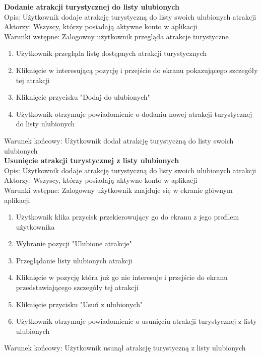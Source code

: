    \textbf{Dodanie atrakcji turystycznej do listy ulubionych} \\ 
        Opis: Użytkownik dodaje atrakcję turystyczną do listy swoich ulubionych atrakcji \\
        Aktorzy: Wszyscy, którzy posiadają aktywne konto w aplikacji \\
        Warunki wstępne: Zalogowny użytkownik przegląda atrakcje turystyczne \\
        \begin{enumerate}
            \item Użytkownik przegląda listę dostępnych atrakcji turystycznych
            \item Kliknięcie w interesującą pozycję i przejście do ekranu pokazującego szczegóły tej atrakcji
            \item Kliknięcie przycisku "Dodaj do ulubionych"
            \item Użytkownik otrzymuje powiadomienie o dodaniu nowej atrakcji turystycznej do listy ulubionych
        \end{enumerate}
        Warunek końcowy: Użytkownik dodał atrakcję turystyczną do listy swoich ulubionych \\

    \textbf{Usunięcie atrakcji turystycznej z listy ulubionych} \\ 
        Opis: Użytkownik dodaje atrakcję turystyczną do listy swoich ulubionych atrakcji \\
        Aktorzy: Wszyscy, którzy posiadają aktywne konto w aplikacji \\
        Warunki wstępne: Zalogowny użytkownik znajduje się w ekranie głównym aplikacji \\
        \begin{enumerate}
            \item Użytkownik klika przycisk przekierowujący go do ekranu z jego profilem użytkownika
            \item Wybranie pozycji "Ulubione atrakcje"
            \item Przeglądanie listy ulubionych atrakcji
            \item Kliknięcie w pozycję która już go nie interesuje i przejście do ekranu przedstawiającego szczegóły tej atrakcji
            \item Kliknięcie przycisku "Usuń z ulubionych"
            \item Użytkownik otrzymuje powiadomienie o usunięciu atrakcji turystycznej z listy ulubionych
        \end{enumerate}
        Warunek końcowy: Użytkownik usunął atrakcję turystyczną z listy ulubionych \\
